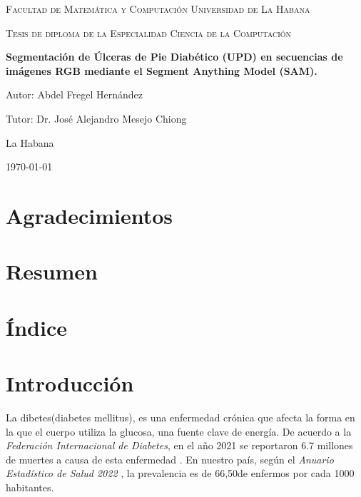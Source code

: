 \documentclass[12pt]{article}
\begin{document}
	\begin{titlepage}
		  \centering
		 
		  
		  {\scshape\LARGE Facultad de Matemática y 
		  	Computación
		  	Universidad de La Habana\par}
		  \vspace{1cm}
		  
		   \vspace{1cm}
		  
		  {\scshape\Large Tesis de diploma de la 
		  	Especialidad Ciencia de la 
		  	Computaci\'on \par}
		  \vspace{1.5cm}
		  
		  {\huge\bfseries Segmentaci\'on de \'Ulceras de Pie Diab\'etico (UPD) en secuencias de im\'agenes RGB mediante el Segment Anything Model (SAM). \par}
		  \vspace{2cm}
		  
		  {\Large Autor: Abdel Fregel Hern\'andez \par}
		  
		  \Large Tutor: Dr. Jos\'e Alejandro Mesejo Chiong
		  \vfill
		  
		  {\large La Habana}
		  
		  {\large \today \par} %
	\end{titlepage}
	
	\section{Agradecimientos}
	\newpage
	
	
	\section{Resumen}
	\newpage
	
	\section{\'Indice}
	\tableofcontents
	\newpage
	\cleardoublepage
	
	
	\section{Introducci\'on}
	La dibetes(diabetes mellitus), es una enfermedad cr\'onica que afecta la forma en la que el cuerpo utiliza la glucosa, una fuente clave de energ\'ia. De acuerdo a la \textit{Federaci\'on Internacional de Diabetes}, en el a\~no 2021 se reportaron 6.7 millones de muertes a causa de esta enfermedad \parencite{DiabetesAtlas2024}. En nuestro pa\'is, seg\'un el \textit{Anuario Estadístico de Salud 2022} \parencite{msp2022}, la prevalencia es de 66,50\textdiscount de enfermos por cada 1000 habitantes.
	\\
	
\end{document}
